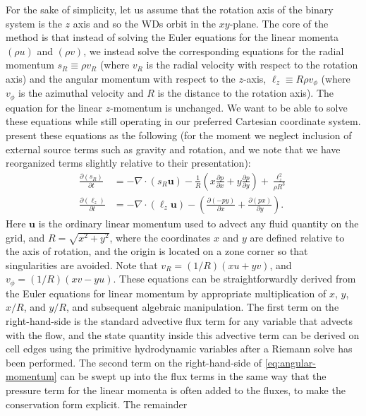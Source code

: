 \documentclass[twocolumn,numberedappendix]{../aastex6}
\begin{document}
For the sake of simplicity, let us assume that the rotation axis of the binary system is the $z$
axis and so the WDs orbit in the $xy$-plane. The core of the method is that instead
of solving the Euler equations for the linear momenta $(\rho u)$ and $(\rho v)$,
we instead solve the corresponding equations for the radial momentum
$s_R \equiv \rho v_R$ (where $v_R$ is the radial velocity with respect to the
rotation axis) and the angular momentum with respect to the $z$-axis,
$\ell_z \equiv R\rho v_\phi$ (where $v_\phi$ is the azimuthal velocity
and $R$ is the distance to the rotation axis).
The equation for the linear $z$-momentum is unchanged. We want to be able
to solve these equations while still operating in our preferred Cartesian
coordinate system. \cite{byerly:2014} present these equations as the following
(for the moment we neglect inclusion of external source terms such as gravity and rotation,
and we note that we have reorganized terms slightly relative to their presentation):
\begin{align}
  \frac{\partial(s_R)}{\partial t} &= -\nabla \cdot (s_R \mathbf{u})
    - \frac{1}{R}\left(x \frac{\partial p}{\partial x} + y \frac{\partial p}{\partial y}\right)
    + \frac{\ell_z^2}{\rho R^3} \label{eq:radial-momentum}\\
    \frac{\partial(\ell_z)}{\partial t} &= -\nabla \cdot (\ell_z \mathbf{u}) - \left(\frac{\partial (-py)}{\partial x} + \frac{\partial(px)}{\partial y}\right).\label{eq:angular-momentum}
\end{align}
Here $\mathbf{u}$ is the ordinary linear momentum used to advect any fluid quantity
on the grid, and $R = \sqrt{x^2 + y^2}$, where the coordinates $x$ and $y$ are defined
relative to the axis of rotation, and the origin is located on a zone corner
so that singularities are avoided. Note that $v_R = (1 / R)(x u + y v)$, and
$v_\phi = (1/R)(x v - y u)$. These equations can be straightforwardly derived from
the Euler equations for linear momentum by appropriate multiplication of $x$, $y$,
$x / R$, and $y/R$, and subsequent algebraic manipulation. The first term on the
right-hand-side is the standard advective flux term for any variable that advects with
the flow, and the state quantity inside this advective term can be derived on cell edges
using the primitive hydrodynamic variables after a Riemann solve has been performed.
The second term on the right-hand-side of \autoref{eq:angular-momentum} can be swept up
into the flux terms in the same way that the pressure term for the linear momenta
is often added to the fluxes, to make the conservation form explicit. The remainder
\end{document}

